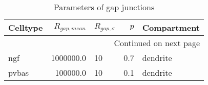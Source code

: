 \begin{longtable}{lrlrl}
\caption{Parameters of gap junctions}\label{gap_junctions_parameters}\\
\toprule
Celltype &      $R_{gap, mean}$ & $R_{gap, \sigma}$ &  $p$ &   Compartment \\
\midrule
\endhead
\midrule
\multicolumn{5}{r}{{Continued on next page}} \\
\midrule
\endfoot

\bottomrule
\endlastfoot
     ngf &  1000000.0 &    10 &   0.7 &  dendrite\ \\
   pvbas &   100000.0 &    10 &   0.1 &  dendrite\ \\
\end{longtable}
